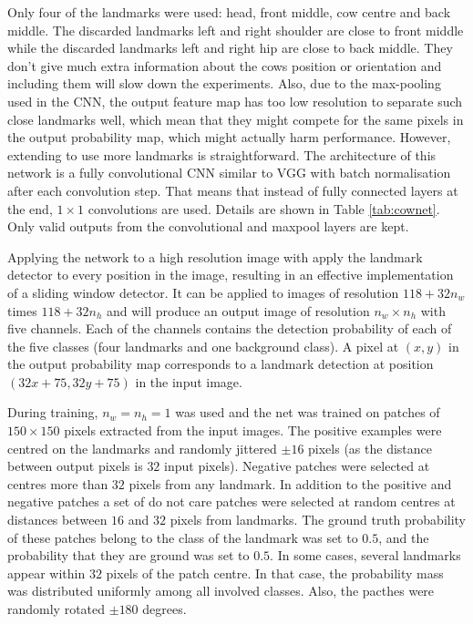\documentclass{cta-author}
\begin{document}
Only four of the landmarks were used: head, front middle, cow centre and back middle. 
The discarded landmarks left and right shoulder are close to front middle while the discarded landmarks left and right hip are close to back middle. They don't give much extra information about the cows position or orientation and including them will slow down the experiments. Also, due to the max-pooling used in the CNN, the output feature map has too low resolution to separate such close landmarks well, which mean that they might compete for the same pixels in the output probability map, which might actually harm performance. However, extending to use more landmarks is straightforward. The architecture of this network is a fully convolutional CNN similar to VGG \cite{Simonyan14c} with batch normalisation \cite{DBLP:journals/corr/IoffeS15} after each convolution step. That means that instead of fully connected layers at the end, $1 \times 1$ convolutions are used. Details are shown in Table \ref{tab:cownet}. Only valid outputs from the convolutional and maxpool layers are kept.

Applying the network to a high resolution image with apply the landmark detector to every position in the image, resulting in an effective implementation of a sliding window detector. It can be applied to images of resolution $118 + 32 n_w$ times $118 + 32 n_h$ and will produce an output image of resolution $n_w \times n_h$ with five channels. Each of the channels contains the detection probability of each of the five classes (four landmarks and one background class). A pixel at $\left(x, y\right)$ in the output probability map corresponds to a landmark detection at position $\left(32 x + 75, 32 y + 75\right)$ in the input image.

During training, $n_w = n_h = 1$ was used and the net was trained on patches of $150\times 150$ pixels extracted from the input images. The positive examples were centred on the landmarks and randomly jittered $\pm 16$ pixels (as the distance between output pixels is $32$ input pixels). Negative patches were selected at centres more than $32$ pixels from any landmark. In addition to the positive and negative patches a set of do not care patches were selected at random centres at distances between $16$ and $32$ pixels from landmarks. The ground truth probability of these patches belong to the class of the landmark was set to $0.5$, and the probability that they are ground was set to $0.5$. In some cases, several landmarks appear within $32$ pixels of the patch centre. In that case, the probability mass was distributed uniformly among all involved classes. Also, the pacthes were randomly rotated $\pm 180$ degrees. 
\end{document}
